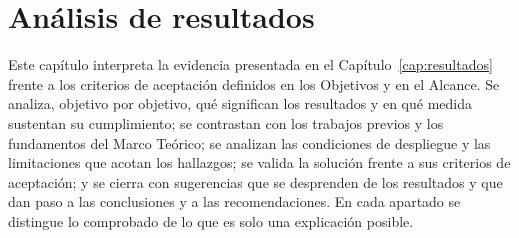 %
%
%
%
\ifdefined\modoensamble
\else
	
\fi

\chapter{Análisis de resultados}
\label{cap:discusion}

Este capítulo interpreta la evidencia presentada en el Capítulo~\ref{cap:resultados} frente a los
criterios de aceptación definidos en los Objetivos y en el Alcance. Se analiza, objetivo por
objetivo, qué significan los resultados y en qué medida sustentan su cumplimiento; se contrastan
con los trabajos previos y los fundamentos del Marco Teórico; se analizan las condiciones de
despliegue y las limitaciones que acotan los hallazgos; se valida la solución frente a sus
criterios de aceptación; y se cierra con sugerencias que se desprenden de los resultados y que
dan paso a las conclusiones y a las recomendaciones. En cada apartado se distingue lo comprobado
de lo que es solo una explicación posible.

